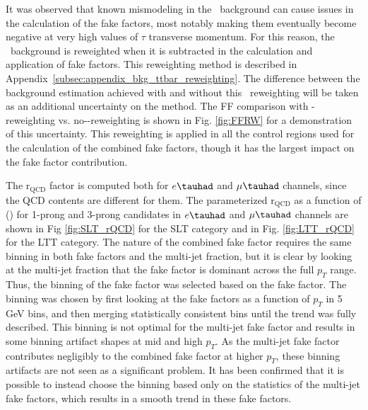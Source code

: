 It was observed that known mismodeling in the \ttbar\ background can cause issues in the calculation of the fake factors, most notably making them eventually become negative at very high values of $\tau$ transverse momentum.  For this reason, the \ttbar\ background is reweighted when it is subtracted in the calculation and application of fake factors.  This reweighting method is described in Appendix~\ref{subsec:appendix_bkg_ttbar_reweighting}.  The difference between the background estimation achieved with and without this \ttbar\ reweighting will be taken as an additional uncertainty on the method. The FF comparison with \ttbar-reweighting vs. no-\ttbar-reweighting is shown in Fig. \ref{fig:FFRW} for a demonstration of this uncertainty. This reweighting is applied in all the control regions used for the calculation of the combined fake factors, though it has the largest impact on the \ttbar fake factor contribution. 

The $\mathrm{r}_{\mathrm{QCD}}$ factor is computed both for $e\tauhad$ and $\mu\tauhad$ channels, since the QCD contents are different for them.
The parameterized $\mathrm{r}_{\mathrm{QCD}}$ as a function of \pT(\tauhad) for 1-prong and 3-prong \tauhad candidates in $e\tauhad$ and $\mu\tauhad$ channels 
are shown in Fig \ref{fig:SLT_rQCD} for the SLT category and in Fig. \ref{fig:LTT_rQCD} for the LTT category. The nature of the combined fake factor requires the same binning in both fake factors and the multi-jet fraction, but it is clear by looking at the multi-jet fraction that the \ttbar fake factor is dominant across the full $p_T$ range.  Thus, the binning of the fake factor was selected based on the \ttbar fake factor.  The binning was chosen by first looking at the fake factors as a function of $p_T$ in 5 GeV bins, and then merging statistically consistent bins until the trend was fully described. This binning is not optimal for the multi-jet fake factor and results in some binning artifact shapes at mid and high $p_T$.  As the multi-jet fake factor contributes negligibly to the combined fake factor at higher $p_T$, these binning artifacts are not seen as a significant problem.  It has been confirmed that it is possible to instead choose the binning based only on the statistics of the multi-jet fake factors, which results in a smooth trend in these fake factors.

